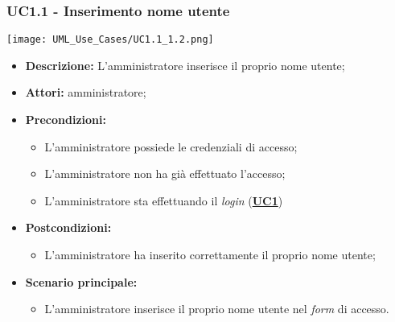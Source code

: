 \subsubsection{UC1.1 - Inserimento nome utente}
\label{sec:UC1.1}
\texttt{[image: UML\_Use\_Cases/UC1.1\_1.2.png]}
\begin{itemize}
	\item \textbf{Descrizione:} L’amministratore inserisce il proprio nome utente;
	\item \textbf{Attori:} amministratore;
	\item \textbf{Precondizioni:} 
	\begin{itemize}
		\item L’amministratore possiede le credenziali di accesso;
		\item L’amministratore non ha già effettuato l’accesso;
		\item L’amministratore sta effettuando il \textit{login} (\hyperref[sec:UC1]{\textbf{UC1}})
	\end{itemize}
	\item \textbf{Postcondizioni:} 
	\begin{itemize}
		\item L’amministratore ha inserito correttamente il proprio nome utente;
	\end{itemize}
	\item \textbf{Scenario principale:} 
	\begin{itemize}
		\item L’amministratore inserisce il proprio nome utente nel \textit{form} di accesso.
	\end{itemize}
\end{itemize}

